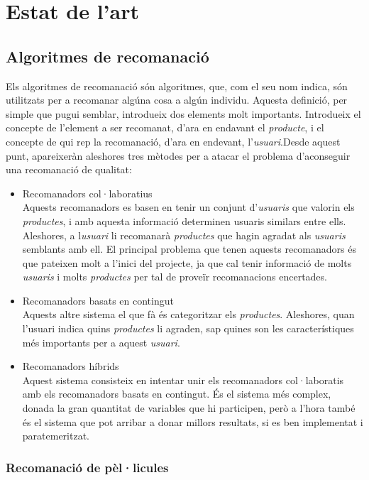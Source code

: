 \chapter{Estat de l'art}

\section{Algoritmes de recomanació}

Els algoritmes de recomanació són algoritmes, que, com el seu nom indica, són utilitzats per a recomanar algúna cosa a algún individu. Aquesta definició, per simple que pugui semblar, introdueix dos elements molt importants. Introdueix el concepte de l'element a ser recomanat, d'ara en endavant el \emph{producte}, i el concepte de qui rep la recomanació, d'ara en endevant, l'\emph{usuari}.Desde aquest punt, apareixeràn aleshores tres mètodes per a atacar el problema d'aconseguir una recomanació de qualitat:

\begin{itemize}
	\item Recomanadors col·laboratius \\
		Aquests recomanadors es basen en tenir un conjunt d'\emph{usuaris} que valorin els \emph{productes}, i amb aquesta informació determinen usuaris similars entre ells. Aleshores, a l\emph{usuari} li recomanarà \emph{productes} que hagin agradat als \emph{usuaris} semblants amb ell. El principal problema que tenen aquests recomanadors és que pateixen molt a l'inici del projecte, ja que cal tenir informació de molts \emph{usuaris} i molts \emph{productes} per tal de proveïr recomanacions encertades.
	\item Recomanadors basats en contingut \\
		Aquests altre sistema el que fà és categoritzar els \emph{productes}. Aleshores, quan l'usuari indica quins \emph{productes} li agraden, sap quines son les característiques més importants per a aquest \emph{usuari}.
	\item Recomanadors híbrids \\
		Aquest sistema consisteix en intentar unir els recomanadors col·laboratis amb els recomanadors basats en contingut. És el sistema més complex, donada la gran quantitat de variables que hi participen, però a l'hora també és el sistema que pot arribar a donar millors resultats, si es ben implementat i paratemeritzat.
\end{itemize}

\subsection{Recomanació de pèl·licules}

